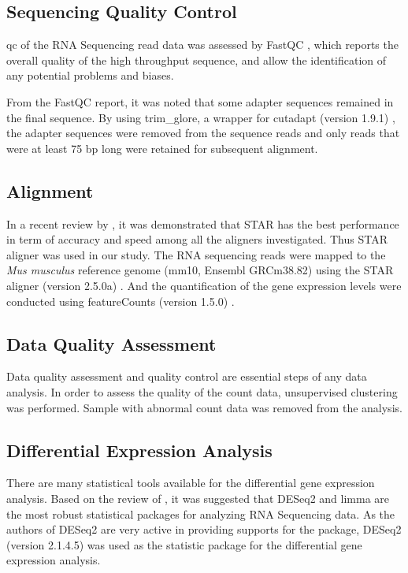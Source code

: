 \subsection{Sequencing Quality Control}
\Gls{qc} of the RNA Sequencing read data was assessed by FastQC \citep{Andrews2010}, which reports the overall quality of the high throughput sequence, and allow the identification of any potential problems and biases.

From the FastQC report, it was noted that some adapter sequences remained in the final sequence.
By using trim\_glore, a wrapper for cutadapt (version 1.9.1) \citep{Martin2011}, the adapter sequences were removed from the sequence reads and only reads that were at least 75 \gls{bp} long were retained for subsequent alignment. 

\subsection{Alignment}
In a recent review by \citet{Engstrom2013}, it was demonstrated that STAR \citep{Dobin2013} has the best performance in term of accuracy and speed among all the aligners investigated.
Thus STAR aligner was used in our study.
The RNA sequencing reads were mapped to the \textit{Mus musculus} reference genome (mm10, Ensembl GRCm38.82) using the STAR aligner (version 2.5.0a) \citep{Dobin2013}.
And the quantification of the gene expression levels were conducted using featureCounts (version 1.5.0) \citep{Liao2014}.

\subsection{Data Quality Assessment}
Data quality assessment and quality control are essential steps of any data analysis. 
In order to assess the quality of the count data, unsupervised clustering was performed.
Sample with abnormal count data was removed from the analysis. 

\subsection{Differential Expression Analysis}
There are many statistical tools available for the differential gene expression analysis.
Based on the review of \citet{Seyednasrollah2015}, it was suggested that DESeq2 and limma are the most robust statistical packages for analyzing RNA Sequencing data. 
As the authors of DESeq2 are very active in providing supports for the package, DESeq2 (version 2.1.4.5) \citep{Love2014} was used as the statistic package for the differential gene expression analysis.

